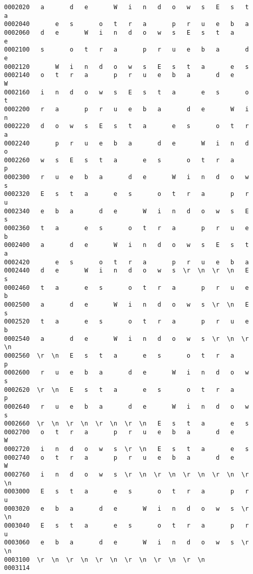 \documentclass[a4paper,11pt]{article}
\begin{document}
\begin{itemize}
\begin{verbatim}
0002020   a       d   e       W   i   n   d   o   w   s   E   s   t   a
0002040       e   s       o   t   r   a       p   r   u   e   b   a    
0002060   d   e       W   i   n   d   o   w   s   E   s   t   a       e
0002100   s       o   t   r   a       p   r   u   e   b   a       d   e
0002120       W   i   n   d   o   w   s   E   s   t   a       e   s    
0002140   o   t   r   a       p   r   u   e   b   a       d   e       W
0002160   i   n   d   o   w   s   E   s   t   a       e   s       o   t
0002200   r   a       p   r   u   e   b   a       d   e       W   i   n
0002220   d   o   w   s   E   s   t   a       e   s       o   t   r   a
0002240       p   r   u   e   b   a       d   e       W   i   n   d   o
0002260   w   s   E   s   t   a       e   s       o   t   r   a       p
0002300   r   u   e   b   a       d   e       W   i   n   d   o   w   s
0002320   E   s   t   a       e   s       o   t   r   a       p   r   u
0002340   e   b   a       d   e       W   i   n   d   o   w   s   E   s
0002360   t   a       e   s       o   t   r   a       p   r   u   e   b
0002400   a       d   e       W   i   n   d   o   w   s   E   s   t   a
0002420       e   s       o   t   r   a       p   r   u   e   b   a    
0002440   d   e       W   i   n   d   o   w   s  \r  \n  \r  \n   E   s
0002460   t   a       e   s       o   t   r   a       p   r   u   e   b
0002500   a       d   e       W   i   n   d   o   w   s  \r  \n   E   s
0002520   t   a       e   s       o   t   r   a       p   r   u   e   b
0002540   a       d   e       W   i   n   d   o   w   s  \r  \n  \r  \n
0002560  \r  \n   E   s   t   a       e   s       o   t   r   a       p
0002600   r   u   e   b   a       d   e       W   i   n   d   o   w   s
0002620  \r  \n   E   s   t   a       e   s       o   t   r   a       p
0002640   r   u   e   b   a       d   e       W   i   n   d   o   w   s
0002660  \r  \n  \r  \n  \r  \n  \r  \n   E   s   t   a       e   s    
0002700   o   t   r   a       p   r   u   e   b   a       d   e       W
0002720   i   n   d   o   w   s  \r  \n   E   s   t   a       e   s    
0002740   o   t   r   a       p   r   u   e   b   a       d   e       W
0002760   i   n   d   o   w   s  \r  \n  \r  \n  \r  \n  \r  \n  \r  \n
0003000   E   s   t   a       e   s       o   t   r   a       p   r   u
0003020   e   b   a       d   e       W   i   n   d   o   w   s  \r  \n
0003040   E   s   t   a       e   s       o   t   r   a       p   r   u
0003060   e   b   a       d   e       W   i   n   d   o   w   s  \r  \n
0003100  \r  \n  \r  \n  \r  \n  \r  \n  \r  \n  \r  \n
0003114
\end{verbatim}


\end{itemize}
\end{document}
